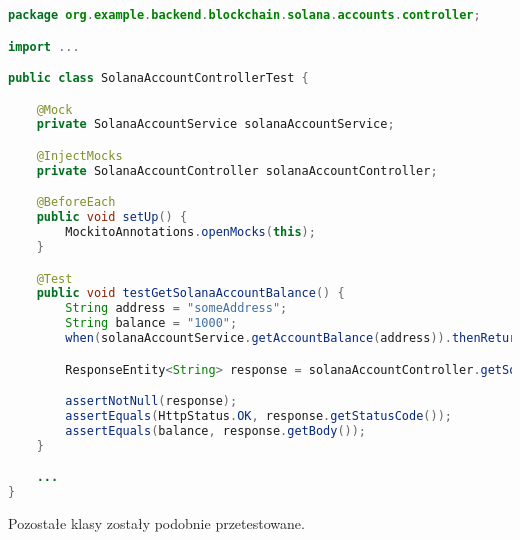 \begin{lstlisting}[language=Java]
package org.example.backend.blockchain.solana.accounts.controller;

import ...

public class SolanaAccountControllerTest {

    @Mock
    private SolanaAccountService solanaAccountService;

    @InjectMocks
    private SolanaAccountController solanaAccountController;

    @BeforeEach
    public void setUp() {
        MockitoAnnotations.openMocks(this);
    }

    @Test
    public void testGetSolanaAccountBalance() {
        String address = "someAddress";
        String balance = "1000";
        when(solanaAccountService.getAccountBalance(address)).thenReturn(Optional.of(balance));

        ResponseEntity<String> response = solanaAccountController.getSolanaAccountBalance(address);

        assertNotNull(response);
        assertEquals(HttpStatus.OK, response.getStatusCode());
        assertEquals(balance, response.getBody());
    }

    ...
}
\end{lstlisting}

Pozostałe klasy zostały podobnie przetestowane.